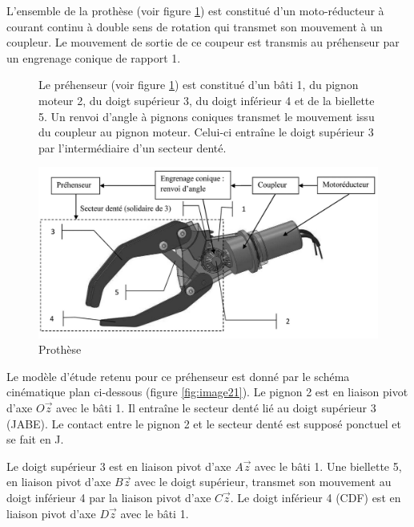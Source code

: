 L'ensemble de la prothèse (voir figure \ref{fig:image20}) est constitué d'un moto-réducteur à courant continu à double sens de rotation qui transmet son mouvement à un coupleur. Le mouvement de sortie de ce coupeur est transmis au préhenseur par un engrenage conique de rapport 1.

\begin{figure}[!ht]
\begin{minipage}{0.45\linewidth}
Le préhenseur (voir figure \ref{fig:image20}) est constitué d'un bâti 1, du pignon moteur 2, du doigt supérieur 3, du doigt inférieur 4 et de la biellette 5. Un renvoi d'angle à pignons coniques transmet le mouvement issu du coupleur au pignon moteur. Celui-ci entraîne le doigt supérieur 3 par l'intermédiaire d'un secteur denté.
\end{minipage}\hfill
\begin{minipage}{0.5\linewidth}
\begin{center}
\includegraphics[width=\linewidth]{img/prothese_1}
\caption{Prothèse}
\label{fig:image20}
\end{center}
\end{minipage}
\end{figure}

Le modèle d'étude retenu pour ce préhenseur est donné par le schéma cinématique plan ci-dessous (figure \ref{fig:image21}). Le pignon 2 est en liaison pivot d'axe $O\overrightarrow{z}$ avec le bâti 1. Il entraîne le secteur denté lié au doigt supérieur 3 (JABE). Le contact entre le pignon 2 et le secteur denté est supposé ponctuel et se fait en J.

Le doigt supérieur 3 est en liaison pivot d'axe $A\overrightarrow{z}$ avec le bâti 1. Une biellette 5, en liaison pivot d'axe $B\overrightarrow{z}$ avec le doigt supérieur, transmet son mouvement au doigt inférieur 4 par la liaison pivot d'axe $C\overrightarrow{z}$. Le doigt inférieur 4 (CDF) est en liaison pivot d'axe $D\overrightarrow{z}$ avec le bâti 1.

